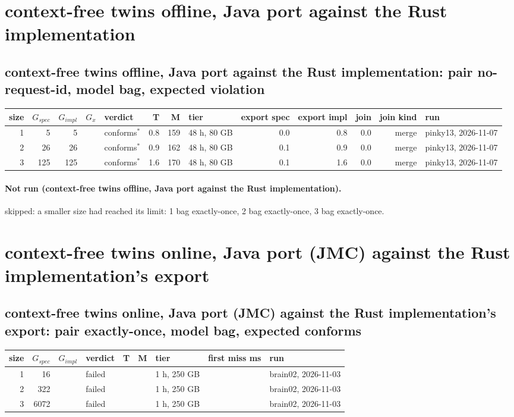 \documentclass[10pt]{article}
\begin{document}
\section*{context-free twins offline, Java port against the Rust implementation}
\subsection*{context-free twins offline, Java port against the Rust implementation: pair \textsf{no-request-id}, model bag, expected violation}
\begin{longtable}{@{}rrrrlrrlrrrrl@{}}
\toprule
size & $G_{\mathit{spec}}$ & $G_{\mathit{impl}}$ & $G_x$ & verdict & T & M & tier & export spec & export impl & join & join kind & run \\
\midrule
\endhead
\color{red} 1 & 5 & 5 &  & conforms$^{\ast}$ & 0.8 & 159 & 48 h, 80 GB & 0.0 & 0.8 & 0.0 & merge & pinky13, 2026-11-07 \\
\color{red} 2 & 26 & 26 &  & conforms$^{\ast}$ & 0.9 & 162 & 48 h, 80 GB & 0.1 & 0.9 & 0.0 & merge & pinky13, 2026-11-07 \\
\color{red} 3 & 125 & 125 &  & conforms$^{\ast}$ & 1.6 & 170 & 48 h, 80 GB & 0.1 & 1.6 & 0.0 & merge & pinky13, 2026-11-07 \\
\bottomrule
\end{longtable}
\paragraph{Not run (context-free twins offline, Java port against the Rust implementation).}
skipped: a smaller size had reached its limit: 1 bag exactly-once, 2 bag exactly-once, 3 bag exactly-once.\par
\section*{context-free twins online, Java port (JMC) against the Rust implementation's export}
\subsection*{context-free twins online, Java port (JMC) against the Rust implementation's export: pair \textsf{exactly-once}, model bag, expected conforms}
\begin{longtable}{@{}rrrlrrlrl@{}}
\toprule
size & $G_{\mathit{spec}}$ & $G_{\mathit{impl}}$ & verdict & T & M & tier & first miss ms & run \\
\midrule
\endhead
\color{blue} 1 & 16 &  & failed &  &  & 1 h, 250 GB &  & brain02, 2026-11-03 \\
\color{blue} 2 & 322 &  & failed &  &  & 1 h, 250 GB &  & brain02, 2026-11-03 \\
\color{blue} 3 & 6072 &  & failed &  &  & 1 h, 250 GB &  & brain02, 2026-11-03 \\
\bottomrule
\end{longtable}
\end{document}
